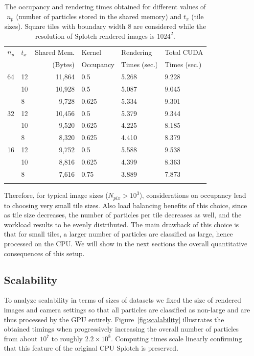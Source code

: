 \documentclass[preprint,5pt]{elsarticle}
\begin{document}
\begin{table}
\label{tab:tuning}
\begin{tabular}{llrlll}
\hline \noalign{\smallskip}
$n_p$ & $t_x$ & Shared Mem. & Kernel & Rendering & Total CUDA \\
            & & (Bytes) & Occupancy & Times (sec.) & Times (sec.) \\
\noalign{\smallskip} \hline \noalign{\smallskip}
64   & 12 & 11,864 & 0.5 & 5.268 & 9.228 \\
      & 10 & 10,928 & 0.5 & 5.087  & 9.045 \\
      & 8 & 9,728 & 0.625 & 5.334  & 9.301 \\
32   & 12 & 10,456 & 0.5 & 5.379 & 9.344 \\
      & 10 & 9,520 & 0.625 & 4.225  & 8.185 \\
      & 8 & 8,320 & 0.625 & 4.410  & 8.379 \\
16  & 12 & 9,752 & 0.5 & 5.588 & 9.538 \\
      & 10 & 8,816 & 0.625 & 4.399 & 8.363 \\
      & 8 & 7,616 & 0.75 & 3.889 & 7.873 \\
\noalign{\smallskip} \hline
\end{tabular}
\caption{The occupancy and rendering times obtained for different values of $n_p$ (number of particles stored in the shared memory) and $t_x$ (tile sizes). Square tiles with boundary width 8 are considered while the resolution of Splotch rendered images is $1024^{2}.$}
\end{table}

Therefore, for typical image sizes ($N_{pix} > 10^3$), considerations on occupancy lead to choosing  very small tile sizes. Also load balancing benefits of this choice, since as tile size decreases, the number of particles per tile decreases as well, and the workload results to be evenly distributed.
The main drawback of this choice is that for small tiles, a larger number of particles are classified as large, hence processed on the CPU. We will show in the next sections the overall quantitative consequences of this setup.  

\subsection{Scalability}
\label{sec:scalability}
To analyze scalability in terms of sizes of datasets we fixed the size of rendered images and camera settings so that all particles are classified as non-large and are thus processed by the GPU entirely. 
Figure~\ref{fig:scalability} illustrates the obtained timings when progressively increasing the overall number of particles
from about $10^7$ to roughly $2.2\times10^8$. Computing times scale linearly confirming that this feature of the original CPU Splotch is preserved. 
\end{document}
